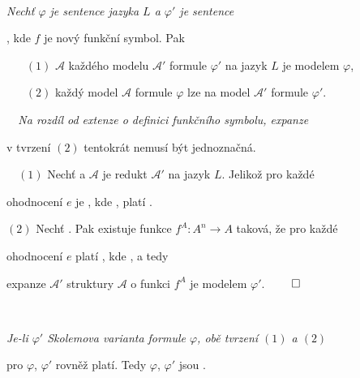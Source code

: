 {\bf {}}\ \ {\it Nechť $\varphi$ je sentence  jazyka $L$ a $\varphi'$ je sentence
\smallskip

 , kde $f$ je nový funkční symbol. Pak
\vspace{0.5mm}

\begin{enumerate}
\item[$(1)$]  $\mathcal{A}$ každého modelu $\mathcal{A'}$ formule $\varphi'$ na jazyk $L$ je modelem $\varphi$,
\vspace{0.5mm}

\item[$(2)$] každý model $\mathcal{A}$ formule $\varphi$ lze  na model $\mathcal{A}'$ formule $\varphi'$.
\end{enumerate}}
\smallskip

{\it {}\ \ Na rozdíl od extenze o definici funkčního symbolu, expanze
\smallskip

v tvrzení $(2)$ tentokrát nemusí být jednoznačná.}
\medskip

{\it {}}\ \ $(1)$ Nechť  a $\mathcal{A}$ je redukt $\mathcal{A}'$ na jazyk $L$. Jelikož pro každé
\smallskip

ohodnocení $e$ je , kde , platí .
\smallskip

$(2)$ Nechť . Pak existuje funkce $f^{A}\colon A^n \to A$ taková, že pro každé
\smallskip

ohodnocení $e$ platí , kde , a tedy
\smallskip

expanze $\mathcal{A'}$ struktury $\mathcal{A}$ o funkci $f^{A}$ je modelem $\varphi'$. $\qed$
\medskip

{\bf {}}\ \ {\it Je-li $\varphi'$ Skolemova varianta formule $\varphi$, obě tvrzení $(1)$ a $(2)$
\smallskip

pro $\varphi$, $\varphi'$ rovněž platí. Tedy $\varphi$, $\varphi'$ jsou .}



    
    
